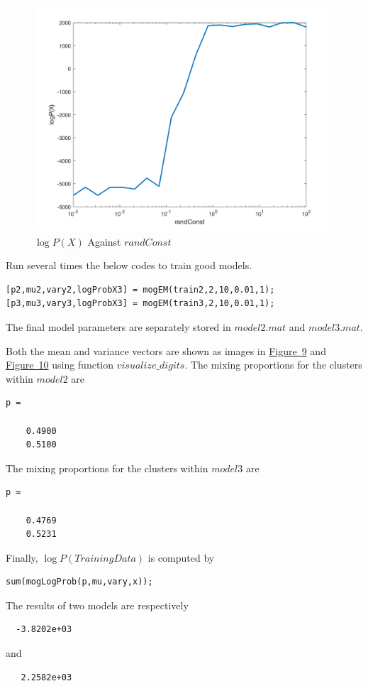 \documentclass{article}
\begin{document}
\begin{figure}
	\centering
	\includegraphics[scale=0.3]{randConst.png}
	\caption{$\log P(X)$ Against $randConst$}
	\label{fig-8}
\end{figure}

Run several times the below codes to train good models.
\begin{lstlisting}
[p2,mu2,vary2,logProbX3] = mogEM(train2,2,10,0.01,1);
[p3,mu3,vary3,logProbX3] = mogEM(train3,2,10,0.01,1);
\end{lstlisting}

The final model parameters are separately stored in $model2.mat$ and $model3.mat$.

Both the mean and variance vectors are shown as images in \hyperref[fig-9]{Figure~9} and \hyperref[fig-10]{Figure~10} using function $visualize\_digits$. The mixing proportions for the clusters within $model2$ are
\begin{verbatim}
p =

    0.4900
    0.5100
\end{verbatim}
The mixing proportions for the clusters within $model3$ are
\begin{verbatim}
p =

    0.4769
    0.5231
\end{verbatim}
Finally, $\log P(Training Data)$ is computed by
\begin{lstlisting}
sum(mogLogProb(p,mu,vary,x));
\end{lstlisting}
The results of two models are respectively
\begin{verbatim}
  -3.8202e+03
\end{verbatim}
and
\begin{verbatim}
   2.2582e+03
\end{verbatim}
\end{document}
